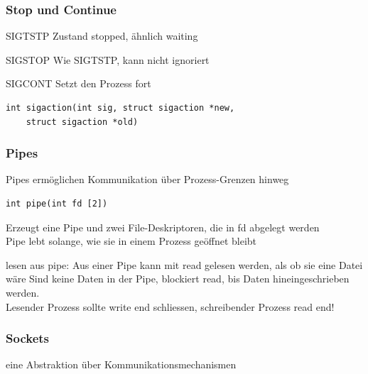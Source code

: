 \begin{multicols*}{5}
	\subsubsection{Stop und Continue}
	\begin{compactitem}[$\bullet$]
		\item \textcolor{h}{SIGTSTP} Zustand stopped, ähnlich waiting
		\item \textcolor{h}{SIGSTOP} Wie SIGTSTP, kann nicht ignoriert
		\item \textcolor{h}{SIGCONT} Setzt den Prozess fort
	\end{compactitem}

	\vspace{-3pt}
	\begin{lstlisting}
int sigaction(int sig, struct sigaction *new,
	struct sigaction *old)		
	\end{lstlisting}

	\vspace{-5pt}

\subsubsection{Pipes}
	Pipes ermöglichen Kommunikation über Prozess-Grenzen hinweg

	\vspace{-5pt}

	\begin{lstlisting}
int pipe(int fd [2])		
	\end{lstlisting}

	\vspace{-5pt}

	Erzeugt eine Pipe und zwei File-Deskriptoren, die in fd abgelegt werden\\
	Pipe lebt solange, wie sie in einem Prozess geöffnet bleibt

	\vspace{-3pt}
	\drule{\linewidth}{1pt}

\textcolor{h}{lesen aus pipe:}
Aus einer Pipe kann mit read gelesen werden, als ob sie eine Datei wäre Sind keine Daten in der Pipe, blockiert read, bis Daten hineingeschrieben werden.\\
Lesender Prozess sollte write end schliessen, schreibender Prozess read end!



\subsubsection{Sockets}
eine Abstraktion über Kommunikationsmechanismen 


\end{multicols*}
